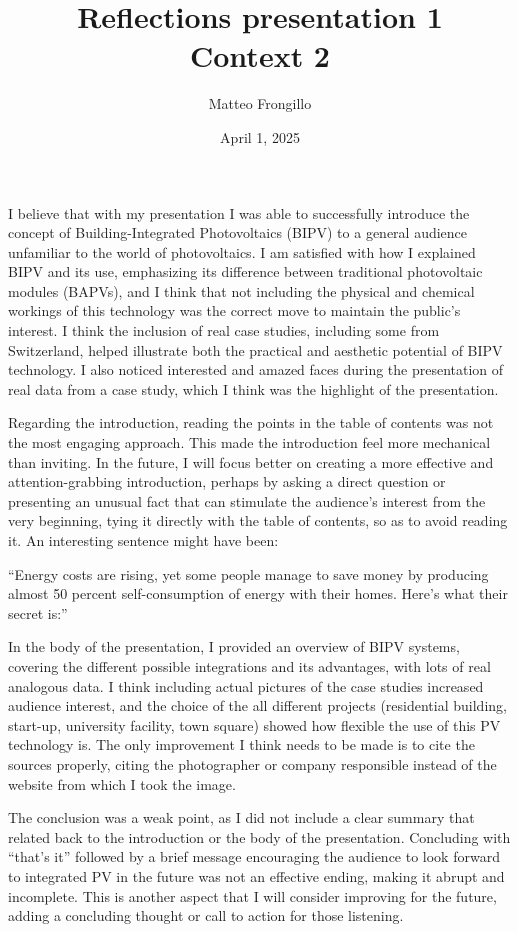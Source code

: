 \documentclass{article}
\title{\textbf{Reflections presentation 1}\\\textbf{Context 2}}
\author{Matteo Frongillo}
\date{April 1, 2025}
\begin{document}
\maketitle
{}
I believe that with my presentation I was able to successfully
introduce the concept of Building-Integrated Photovoltaics (BIPV) to
a general audience unfamiliar to the world of photovoltaics. I am
satisfied with how I explained BIPV and its use, emphasizing its
difference between traditional photovoltaic modules (BAPVs), and I
think that not including the physical and chemical workings of this
technology was the correct move to maintain the public's interest. I
think the inclusion of real case studies, including some from
Switzerland, helped illustrate both the practical and aesthetic
potential of BIPV technology. I also noticed interested and amazed
faces during the presentation of real data from a case study, which I
think was the highlight of the presentation.

Regarding the introduction, reading the points in the table of
contents was not the most engaging approach. This made the
introduction feel more mechanical than inviting. In the future,
I will focus better on creating a more effective and
attention-grabbing introduction, perhaps by asking a direct question
or presenting an unusual fact that can stimulate the audience's
interest from the very beginning, tying it directly with the table of
contents, so as to avoid reading it. An interesting sentence might
have been:

``Energy costs are rising, yet some people manage to save
money by producing almost 50 percent self-consumption of energy with
their homes. Here's what their secret is:''

In the body of the presentation, I provided an overview of BIPV
systems, covering the different possible integrations and its
advantages, with lots of real analogous data. I think including
actual pictures of the case studies increased audience
interest, and the choice of the all different
projects (residential building, start-up, university facility, town
square) showed how flexible the use of this PV technology is. The only
improvement I think needs to be made is to cite the sources properly,
citing the photographer or company responsible instead of the website
from which I took the image.

The conclusion was a weak point, as I did not include a clear summary
that related back to the introduction or the body of the presentation.
Concluding with “that's it” followed by a brief message encouraging the
audience to look forward to integrated PV in the future was not an
effective ending, making it abrupt and incomplete. This is another
aspect that I will consider improving for the future, adding a
concluding thought or call to action for those listening.
\end{document}
